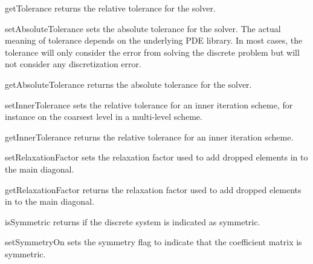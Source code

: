 \begin{methoddesc}[SolverOptions]{getTolerance}{}
returns the relative tolerance for the solver.
\end{methoddesc}

\begin{methoddesc}[SolverOptions]{setAbsoluteTolerance}{}
sets the absolute tolerance for the solver. The actual meaning of tolerance
depends on the underlying PDE library. In most cases, the tolerance
will only consider the error from solving the discrete problem but will
not consider any discretization error.
\end{methoddesc}

\begin{methoddesc}[SolverOptions]{getAbsoluteTolerance}{}
returns the absolute tolerance for the solver.
\end{methoddesc}

\begin{methoddesc}[SolverOptions]{setInnerTolerance}{}
sets the relative tolerance for an inner iteration scheme, for instance
on the coarsest level in a multi-level scheme.
\end{methoddesc}

\begin{methoddesc}[SolverOptions]{getInnerTolerance}{}
returns the relative tolerance for an inner iteration scheme.
\end{methoddesc}

\begin{methoddesc}[SolverOptions]{setRelaxationFactor}{}
sets the relaxation factor used to add dropped elements in \RILU to the main diagonal.
\end{methoddesc}

\begin{methoddesc}[SolverOptions]{getRelaxationFactor}{}
returns the relaxation factor used to add dropped elements in \RILU to the main diagonal.
\end{methoddesc}

\begin{methoddesc}[SolverOptions]{isSymmetric}{}
returns \True if the discrete system is indicated as symmetric.
\end{methoddesc}

\begin{methoddesc}[SolverOptions]{setSymmetryOn}{}
sets the symmetry flag to indicate that the coefficient matrix is symmetric.
\end{methoddesc}

